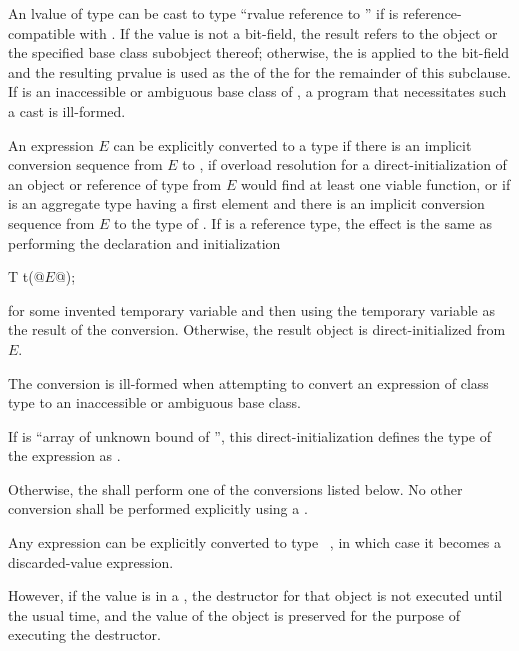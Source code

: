 \pnum
An lvalue
of type  can be cast to type ``rvalue
reference to '' if  is reference-compatible with
. If the value is not a bit-field,
the result refers to the object or the specified base class subobject
thereof; otherwise, the 
is applied to the bit-field and the resulting prvalue is used as the
 of the  for the remainder of this subclause.
If  is an inaccessible or
ambiguous base class of ,
a program that necessitates such a cast is ill-formed.

\pnum
An expression $E$ can be explicitly converted to a type 
if there is an implicit conversion sequence
from $E$ to ,
if overload resolution for a direct-initialization
of an object or reference of type  from $E$
would find at least one viable function, or
if  is an aggregate type
having a first element  and
there is an implicit conversion sequence
from $E$ to the type of .
If  is a reference type, the effect is
the same as performing the declaration and initialization
\begin{codeblock}
T t(@$E$@);
\end{codeblock}
for some invented temporary variable 
and then using the temporary variable as the result of the conversion.
Otherwise, the result object is direct-initialized from $E$.
\begin{note}
The conversion is ill-formed when attempting to convert an
expression of class type to an inaccessible or ambiguous base class.
\end{note}
\begin{note}
If  is ``array of unknown bound of '',
this direct-initialization defines the type of the expression as .
\end{note}

\pnum
Otherwise, the  shall perform one of the conversions
listed below. No other conversion shall be performed explicitly using a
.

\pnum
Any expression can be explicitly converted to type \cv{}~,
in which case it becomes a discarded-value
expression.
\begin{note}
However, if the value is in a , the destructor for that
object is
not executed until the usual time, and the value of the object is
preserved for the purpose of executing the destructor.
\end{note}


